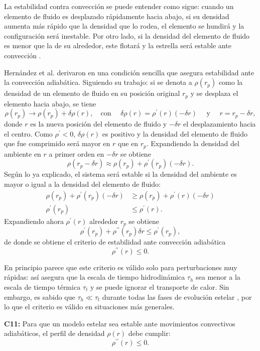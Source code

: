 La estabilidad contra convección se puede entender como sigue: cuando un elemento de fluido es desplazado rápidamente hacia abajo, si su densidad aumenta más rápido que la densidad que lo rodea, el elemento se hundirá y la configuración será inestable. Por otro lado, si la densidad del elemento de fluido es menor que la de su alrededor, este flotará y la estrella será estable ante convección \cite{Bondi1964a}. 

Hernández et al. derivaron en \cite{Hernandez2018} una condición sencilla que asegura estabilidad ante la convección adiabática. Siguiendo su trabajo: si se denota a $\rho(r_p)$ como la densidad de un elemento de fluido en su posición original $r_p$ y se desplaza el elemento hacia abajo, se tiene
\begin{equation}
    \rho\left(r_{p}\right) \rightarrow \rho\left(r_{p}\right)+\delta \rho(r),\quad \text {con } \quad \delta \rho(r)=\rho^{\prime}(r)(-\delta r) \quad \text { y } \quad r=r_{p}-\delta r,
\end{equation}
donde $r$ es la nueva posición del elemento de fluido y $-\delta r$ el desplazamiento hacia el centro. 
Como $\rho^{\prime} < 0$, $\delta \rho(r)$ es positivo y la densidad del elemento de fluido que fue comprimido será mayor en $r$ que en $r_p$. 
Expandiendo la densidad del ambiente en $r$ a primer orden en $-\delta r$ se obtiene
\begin{equation}
    \rho\left(r_{p}-\delta r\right) \approx \rho\left(r_{p}\right)+\rho^{\prime}\left(r_{p}\right)(-\delta r).
\end{equation}
Según lo ya explicado, el sistema será estable si la densidad del ambiente es mayor o igual a la densidad del elemento de fluido:
\begin{align*}
    \rho\left(r_{p}\right)+\rho^{\prime}\left(r_{p}\right)(-\delta r) &\geq \rho\left(r_{p}\right)+\rho^{\prime}(r)(-\delta r) \\ \rho^{\prime}\left(r_{p}\right) &\leq \rho^{\prime}(r).
\end{align*}
Expandiendo ahora $\rho^{\prime}(r)$ alrededor $r_p$ se obtiene
\begin{equation}
    \rho^{\prime}\left(r_{p}\right)+\rho^{\prime \prime}\left(r_{p}\right) \delta r \leq \rho^{\prime}\left(r_{p}\right),
\end{equation}
de donde se obtiene el criterio de estabilidad ante convección adiabática
\begin{equation}
    \rho^{\prime \prime}(r) \leq 0.
\end{equation}

En principio parece que este criterio es válido solo para perturbaciones muy rápidas: así asegura que la escala de tiempo hidrodinámica $\tau_h$ sea menor a la escala de tiempo térmica $\tau_t$ y se puede ignorar el transporte de calor. Sin embargo, es sabido que $\tau_h \ll \tau_t$ durante todas las fases de evolución estelar \cite{Bisnovatyi-Kogan2011}, por lo que el criterio es válido en situaciones más generales.  

\textbf{C11:} Para que un modelo estelar sea estable ante movimientos convectivos adiabáticos, el perfil de densidad $\rho(r)$ debe cumplir: 
\begin{equation}
    \rho ^ { \prime \prime } ( r ) \leq 0.
\end{equation}